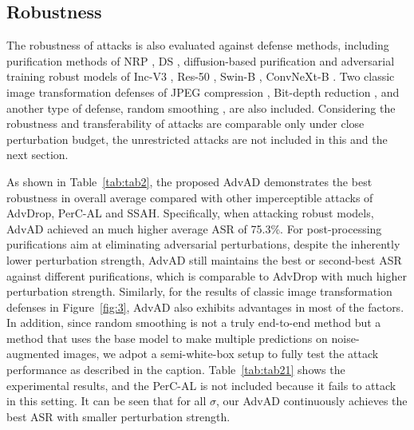 \documentclass{article}
\begin{document}
\subsection{Robustness}


The robustness of attacks is also evaluated against defense methods, including purification methods of NRP \cite{naseer2020self}, DS \cite{salman2020denoised}, diffusion-based purification \cite{lee2023robust} and adversarial training robust models of Inc-V3 \cite{tramèr2018ensemble}, Res-50 \cite{salman2020adversarially}, Swin-B \cite{liu2023comprehensive}, ConvNeXt-B \cite{liu2023comprehensive}. Two classic image transformation defenses of JPEG compression \cite{das2018shield}, Bit-depth reduction \cite{guo2018countering}, and another type of defense, random smoothing \cite{cohen2019certified}, are also included. Considering the robustness and transferability of attacks are comparable only under close perturbation budget, the unrestricted attacks are not included in this and the next section.



As shown in Table~\ref{tab:tab2}, the proposed AdvAD demonstrates the best robustness in overall average
compared with other imperceptible attacks of AdvDrop, PerC-AL and SSAH. Specifically, when attacking robust models, AdvAD achieved an much higher average ASR of 75.3$\%$. For post-processing purifications aim at eliminating adversarial perturbations, despite the inherently lower perturbation strength, AdvAD still maintains the best or second-best ASR against different purifications, which is comparable to AdvDrop with much higher perturbation strength. Similarly, for the results of classic image transformation defenses in Figure~\ref{fig:3}, AdvAD also exhibits advantages in most of the factors.
In addition, since random smoothing is not a truly end-to-end method but a method that uses the base model to make multiple predictions on noise-augmented images, we adpot a semi-white-box setup to fully test the attack performance as described in the caption. Table~\ref{tab:tab21} shows the experimental results, and the PerC-AL is not included because it fails to attack in this setting. It can be seen that for all $\sigma$, our AdvAD continuously achieves the best ASR with smaller perturbation strength.
\end{document}
